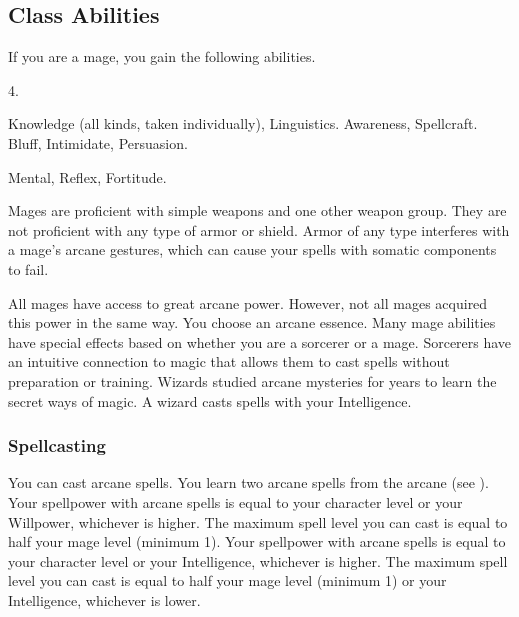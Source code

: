     \subsection{Class Abilities}
        If you are a mage, you gain the following abilities.

         4.

         Knowledge (all kinds, taken individually), Linguistics.
         Awareness, Spellcraft.
         Bluff, Intimidate, Persuasion.

          Mental,  Reflex,  Fortitude.

        Mages are proficient with simple weapons and one other weapon group.
        They are not proficient with any type of armor or shield.
        Armor of any type interferes with a mage's arcane gestures, which can cause your spells with somatic components to fail.

        All mages have access to great arcane power.
        However, not all mages acquired this power in the same way.
        You choose an arcane essence.
        Many mage abilities have special effects based on whether you are a sorcerer or a mage.
         Sorcerers have an intuitive connection to magic that allows them to cast spells without preparation or training.
         Wizards studied arcane mysteries for years to learn the secret ways of magic.
        A wizard casts spells with your Intelligence.

        \subsubsection{Spellcasting}

            You can cast arcane spells.
            You learn two arcane spells from the arcane  (see ).
             Your spellpower with arcane spells is equal to your character level or your Willpower, whichever is higher.
            The maximum spell level you can cast is equal to half your mage level (minimum 1).
             Your spellpower with arcane spells is equal to your character level or your Intelligence, whichever is higher.
            The maximum spell level you can cast is equal to half your mage level (minimum 1) or your Intelligence, whichever is lower.

